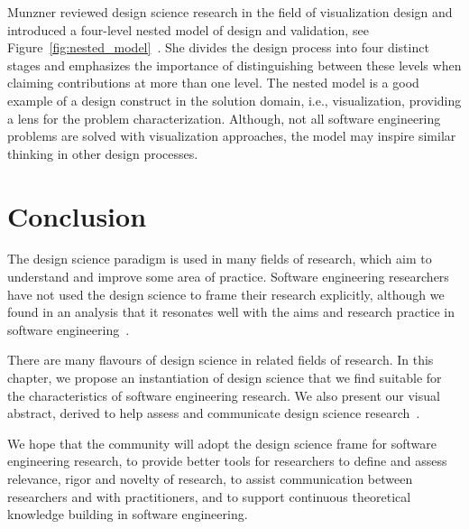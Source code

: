 \documentclass[graybox]{svmult}
\newcommand{\per}[1]{\textcolor{cyan}{{\it [Per says: #1]}}}
\newcommand{\per}[1]{}
\begin{document}
Munzner reviewed design science research in the field of visualization design and introduced a four-level nested model of design and validation, see Figure~\ref{fig:nested_model}~\cite{munzner2009}. She divides the design process into four distinct stages and emphasizes the importance of distinguishing between these levels when claiming contributions at more than one level. The nested model is a good example of a design construct in the solution domain, i.e., visualization, providing a lens for the problem characterization. Although, not all software engineering problems are solved with visualization approaches, the model may inspire similar thinking in other design processes. 







\section{Conclusion}
\label{sec:conclusion}
The design science paradigm is used in many fields of research, which aim to understand and improve some area of practice. Software engineering researchers have not used the design science to frame their research explicitly, although we found in an analysis that it resonates well with the aims and research practice in software engineering~\cite{Engstrom19arxiv}. 

There are many flavours of design science in related fields of research. In this chapter, we propose an instantiation of design science that we find suitable for the characteristics of software engineering research. We also present our visual abstract, derived to help assess and communicate design science research~\cite{StoreyESEM17}. 

We hope that the community will adopt the design science frame for software engineering research, to provide better tools for researchers to define and assess relevance, rigor and novelty of research, to assist communication between researchers and with practitioners, and to support continuous theoretical knowledge building in software engineering. 




\end{document}
